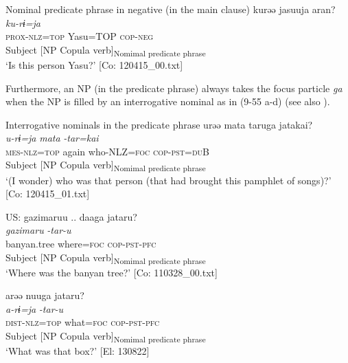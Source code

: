 \ea   Nominal predicate phrase in negative (in the main clause) \label{ex:9.54}
 \gllll  kurəə  jasuuja  aran?\\
    \textit{ku-rɨ=ja}  \textit{}  \textit{}\\
    \textsc{prox}-\textsc{nlz}=\textsc{top}  Yasu=TOP  \textsc{cop}-\textsc{neg}\\
    Subject  [NP  Copula verb]\textsubscript{Nomimal predicate phrase}\\
    \glt     ‘Is this person Yasu?’ [Co: 120415\_00.txt]
\z

Furthermore, an NP (in the predicate phrase) always takes the focus particle \textit{ga} when the NP is filled by an interrogative nominal as in (9-55 a-d) (see also ).

\ea   Interrogative nominals in the predicate phrase  \label{ex:9.55}
\ea %
 \gllll  urəə  mata  taruga  jatakai?\\
      \textit{u-rɨ=ja}  \textit{mata}  \textit{}  \textit{-tar=kai}\\
      \textsc{mes}-\textsc{nlz}=\textsc{top}  again  who-NLZ=\textsc{foc}  \textsc{cop}-\textsc{pst}=\textsc{du}B\\
      Subject    [NP  Copula verb]\textsubscript{Nomimal predicate phrase}\\
      \glt       ‘(I wonder) who was that person (that had brought this pamphlet of songs)?’ [Co: 120415\_01.txt]

\ex \label{ex:9.55b} \gllll   US:  gazimaruu  ..  daaga  jataru?\\
      \textit{gazimaru}    \textit{}  \textit{-tar-u}\\
      banyan.tree    where=\textsc{foc}  \textsc{cop}-\textsc{pst}-\textsc{pfc}\\
      Subject    [NP  Copula verb]\textsubscript{Nomimal predicate phrase}\\
      \glt       ‘Where was the banyan tree?’ [Co: 110328\_00.txt]

\ex \label{ex:9.55c} %
    \gllll  arəə  nuuga  jataru?\\
      \textit{a-rɨ=ja}  \textit{}  \textit{-tar-u}\\
      \textsc{dist}-\textsc{nlz}=\textsc{top}  what=\textsc{foc}  \textsc{cop}-\textsc{pst}-\textsc{pfc}\\
      Subject  [NP  Copula verb]\textsubscript{Nomimal predicate phrase}\\
      \glt       ‘What was that box?’ [El: 130822]

